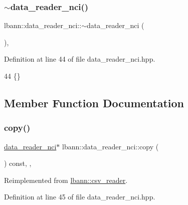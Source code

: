 \subsubsection{\texorpdfstring{$\sim$data\+\_\+reader\+\_\+nci()}{~data\_reader\_nci()}}
{\footnotesize\ttfamily lbann\+::data\+\_\+reader\+\_\+nci\+::$\sim$data\+\_\+reader\+\_\+nci (\begin{DoxyParamCaption}{ }\end{DoxyParamCaption})\hspace{0.3cm}{\ttfamily [inline]}, {\ttfamily [override]}}



Definition at line 44 of file data\+\_\+reader\+\_\+nci.\+hpp.


\begin{DoxyCode}
44 \{\}
\end{DoxyCode}


\subsection{Member Function Documentation}
\mbox{\label{classlbann_1_1data__reader__nci_a642f96edf3efae0d5d0aad70d8a17dbe}} 
\subsubsection{\texorpdfstring{copy()}{copy()}}
{\footnotesize\ttfamily \hyperlink{classlbann_1_1data__reader__nci}{data\+\_\+reader\+\_\+nci}$\ast$ lbann\+::data\+\_\+reader\+\_\+nci\+::copy (\begin{DoxyParamCaption}{ }\end{DoxyParamCaption}) const\hspace{0.3cm}{\ttfamily [inline]}, {\ttfamily [override]}, {\ttfamily [virtual]}}



Reimplemented from \hyperlink{classlbann_1_1csv__reader_a6a45ad54bb7f2b30722d70ea8921243d}{lbann\+::csv\+\_\+reader}.



Definition at line 45 of file data\+\_\+reader\+\_\+nci.\+hpp.


